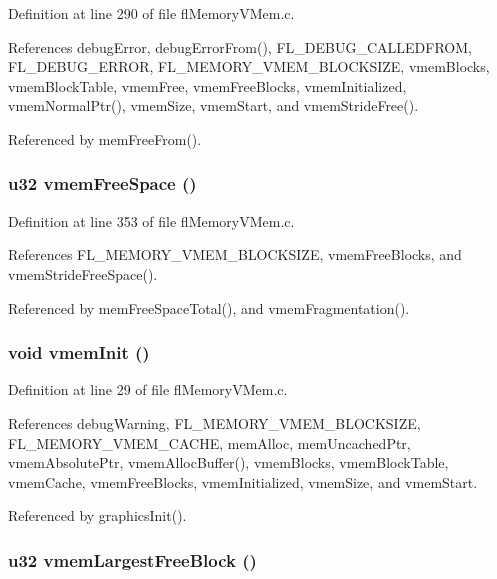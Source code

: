 Definition at line 290 of file fl\-Memory\-VMem.c.

References debug\-Error, debug\-Error\-From(), FL\_\-DEBUG\_\-CALLEDFROM, FL\_\-DEBUG\_\-ERROR, FL\_\-MEMORY\_\-VMEM\_\-BLOCKSIZE, vmem\-Blocks, vmem\-Block\-Table, vmem\-Free, vmem\-Free\-Blocks, vmem\-Initialized, vmem\-Normal\-Ptr(), vmem\-Size, vmem\-Start, and vmem\-Stride\-Free().

Referenced by mem\-Free\-From().
\subsubsection{\setlength{\rightskip}{0pt plus 5cm}u32 vmem\-Free\-Space ()}\label{flMemoryVMem_8c_87da7eb38a8d057e45dc6ce6f346f63f}




Definition at line 353 of file fl\-Memory\-VMem.c.

References FL\_\-MEMORY\_\-VMEM\_\-BLOCKSIZE, vmem\-Free\-Blocks, and vmem\-Stride\-Free\-Space().

Referenced by mem\-Free\-Space\-Total(), and vmem\-Fragmentation().
\subsubsection{\setlength{\rightskip}{0pt plus 5cm}void vmem\-Init ()}\label{flMemoryVMem_8c_2089203f3b650112b2532238ef57d6d0}




Definition at line 29 of file fl\-Memory\-VMem.c.

References debug\-Warning, FL\_\-MEMORY\_\-VMEM\_\-BLOCKSIZE, FL\_\-MEMORY\_\-VMEM\_\-CACHE, mem\-Alloc, mem\-Uncached\-Ptr, vmem\-Absolute\-Ptr, vmem\-Alloc\-Buffer(), vmem\-Blocks, vmem\-Block\-Table, vmem\-Cache, vmem\-Free\-Blocks, vmem\-Initialized, vmem\-Size, and vmem\-Start.

Referenced by graphics\-Init().
\subsubsection{\setlength{\rightskip}{0pt plus 5cm}u32 vmem\-Largest\-Free\-Block ()}\label{flMemoryVMem_8c_9c58c42e2ef77c55eca5f31df1ffd5c4}




